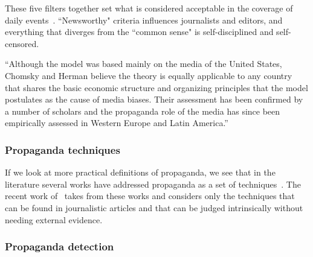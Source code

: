 These five filters together set what is considered acceptable in the coverage of daily events~\citep{phillips2007left}. ``Newsworthy" criteria influences journalists and editors, and everything that diverges from the ``common sense" is self-disciplined and self-censored.

“Although the model was based mainly on the media of the United States, Chomsky and Herman believe the theory is equally applicable to any country that shares the basic economic structure and organizing principles that the model postulates as the cause of media biases. Their assessment has been confirmed by a number of scholars and the propaganda role of the media has since been empirically assessed in Western Europe and Latin America.”~\cite{herman1996propaganda}


\subsubsection{Propaganda techniques}

If we look at more practical definitions of propaganda, we see that in the literature several works have addressed propaganda as a set of techniques~\citep{torok2015symbiotic,miller1939techniques,weston2018rulebook}. The recent work of~\citet{da2019fine} takes from these works and considers only the techniques that can be found in journalistic articles and that can be judged intrinsically without needing external evidence.



\subsubsection{Propaganda detection}
\label{ssec:lit_propaganda_detection}




